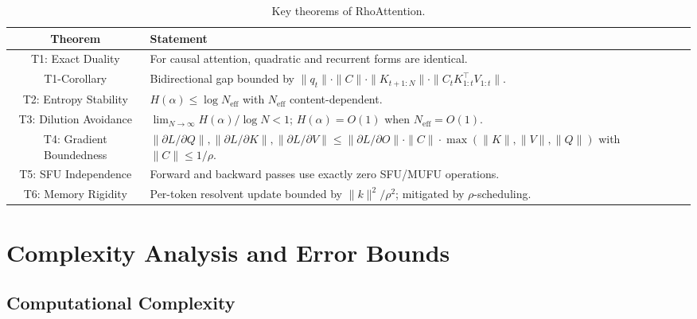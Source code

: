 \documentclass[11pt,a4paper]{article}
\theoremstyle{remark}
\begin{document}
\begin{table}[h]
\centering
\caption{Key theorems of RhoAttention.}
\begin{tabular}{cl}
\toprule
\textbf{Theorem} & \textbf{Statement} \\
\midrule
T1: Exact Duality & For causal attention, quadratic and recurrent forms are identical. \\
T1-Corollary & Bidirectional gap bounded by $\|q_t\| \cdot \|C\| \cdot \|K_{t+1:N}\| \cdot \|C_t K_{1:t}^\top V_{1:t}\|$. \\
T2: Entropy Stability & $H(\alpha) \leq \log N_{\text{eff}}$ with $N_{\text{eff}}$ content-dependent. \\
T3: Dilution Avoidance & $\lim_{N \to \infty} H(\alpha)/\log N < 1$; $H(\alpha) = O(1)$ when $N_{\text{eff}} = O(1)$. \\
T4: Gradient Boundedness & $\|\partial L/\partial Q\|, \|\partial L/\partial K\|, \|\partial L/\partial V\| \leq \|\partial L/\partial O\| \cdot \|C\| \cdot \max(\|K\|,\|V\|,\|Q\|)$ with $\|C\| \leq 1/\rho$. \\
T5: SFU Independence & Forward and backward passes use exactly zero SFU/MUFU operations. \\
T6: Memory Rigidity & Per-token resolvent update bounded by $\|k\|^2/\rho^2$; mitigated by $\rho$-scheduling. \\
\bottomrule
\end{tabular}
\end{table}

\section{Complexity Analysis and Error Bounds}
\label{sec:complexity}

\subsection{Computational Complexity}
\end{document}
